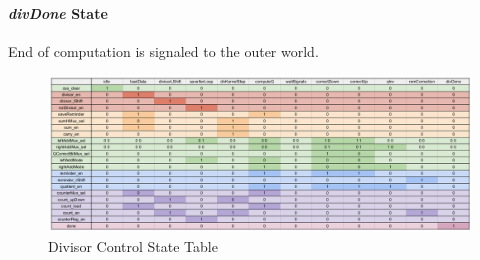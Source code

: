 \paragraph{\textit{divDone} State}
End of computation is signaled to the outer world.
\begin{figure}[H]
\centering
\includegraphics[scale=0.38]{pics/divControlTable.png}
    \caption{Divisor Control State Table}
    \label{fig:my_label}
\end{figure}
